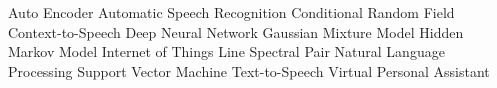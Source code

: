 


  {Auto Encoder}
 {Automatic Speech Recognition}
 {Conditional Random Field}
 {Context-to-Speech}
 {Deep Neural Network}
 {Gaussian Mixture Model}
 {Hidden Markov Model}
 {Internet of Things}
 {Line Spectral Pair}
 {Natural Language Processing}
 {Support Vector Machine}
 {Text-to-Speech}
 {Virtual Personal Assistant}



